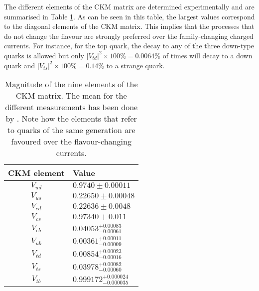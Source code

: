 The different elements of the CKM matrix are determined experimentally and are
summarised in Table \ref{tab:Chap1:CKM}.
 As can be seen in this table, the largest values correspond to the diagonal elements of the CKM matrix.
This implies that the processes that do not change the flavour are strongly preferred over the 
family-changing charged currents. For instance, for the top quark, the decay to any of the three down-type 
quarks is allowed but only $|V_{td}|^{2}\times 100\% = 0.0064\%$ of times will decay to a down quark and
 $|V_{ts}|^{2}\times 100\% = 0.14\%$ to a strange quark.

\begin{table}[]
\centering
\begin{tabular}{c|l }
\toprule
CKM element 	  & Value \\
\midrule
   $V_{ud}$         &   $0.9740 \pm 0.00011$	%
   	\\
   $V_{us}$         &   $0.22650 \pm 0.00048$    	%
   	\\
   $V_{cd}$         &   $0.22636 \pm 0.0048$    		%
   	\\
   $V_{cs}$         &   $0.97340\pm0.011$		%
   	\\
   $V_{cb}$         &   $0.04053^{+0.00083}_{-0.00061}$	    	%
   	\\
   $V_{ub}$         &   $0.00361^{+0.00011}_{-0.00009}$   	%
  	\\ 	
   $V_{td}$          &   $0.00854^{+0.00023}_{-0.00016}$    	%
   	\\
   $V_{ts}$          &   $0.03978^{+0.00082}_{-0.00060}$  		%
   	\\
   $V_{tb}$          &   $ 0.999172^{+0.000024}_{-0.000035}$ 		%
   	\\
\bottomrule
\end{tabular}
\caption{Magnitude of the nine elements of the CKM matrix. The mean for the different measurements has been done by \cite{ParticleDataGroup:2020ssz}. Note how the elements that refer to quarks of the same generation are favoured over the flavour-changing currents.}
\label{tab:Chap1:CKM}
\end{table} %


